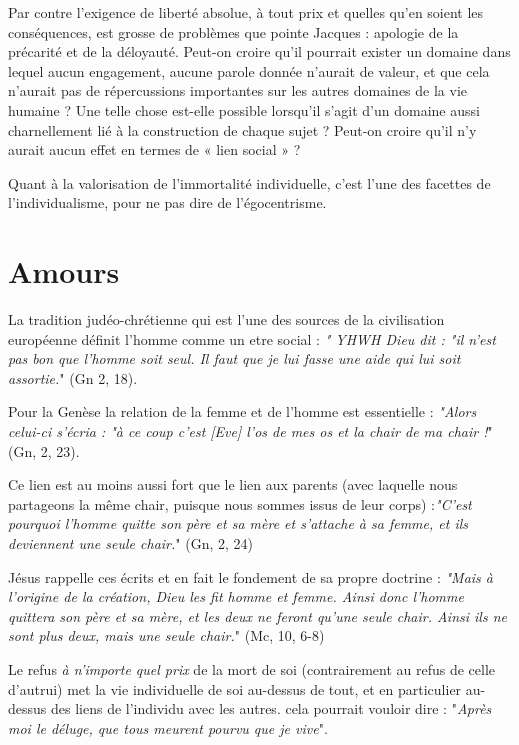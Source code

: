  Par contre l'exigence de liberté absolue, à tout prix et quelles qu'en soient les conséquences, est grosse de problèmes que pointe Jacques  : apologie de la précarité et de la déloyauté. Peut-on croire qu'il pourrait exister un domaine  dans lequel aucun engagement, aucune parole donnée n'aurait de valeur, et que cela n'aurait pas de répercussions importantes sur les autres domaines de la vie humaine ? Une telle chose est-elle possible lorsqu'il s'agit d'un domaine aussi charnellement lié à la construction de chaque sujet ? Peut-on croire qu'il n'y aurait aucun effet en termes de « lien social » ?
 
 Quant à la valorisation de l'immortalité individuelle, c'est l'une des facettes de l'individualisme, pour ne pas dire de l'égocentrisme. 
 


 \chapter{Amours}
 
  
 
 La tradition judéo-chrétienne qui est l'une des sources de la civilisation européenne définit l'homme comme un etre social : \emph{" YHWH Dieu dit : "il n'est pas bon que l'homme soit seul. Il faut que je lui fasse une aide qui lui soit assortie.}" (Gn 2, 18). 
 
 Pour la Genèse la relation de la femme et de l'homme est essentielle : \emph{"Alors celui-ci s'écria : "à ce coup c'est [Eve] l'os de mes os et la chair de ma chair !}" (Gn, 2, 23). 
 
 Ce lien est au moins aussi fort que le lien aux parents (avec laquelle nous partageons la même chair, puisque nous sommes issus de leur corps) :\emph{"C'est pourquoi l'homme quitte son père et sa mère et s'attache à sa femme, et ils deviennent une seule chair.}" (Gn, 2, 24)
 
Jésus rappelle ces écrits et en fait le fondement de sa propre doctrine :
\emph{"Mais à l'origine de la création, Dieu les fit homme et femme. Ainsi donc l'homme quittera son père et sa mère, et les deux ne feront qu'une seule chair. Ainsi ils ne sont plus deux, mais une seule chair.}" (Mc, 10, 6-8)

Le refus \emph{à n'importe quel prix} de la mort de soi (contrairement au refus de celle d'autrui) met la vie individuelle de soi au-dessus de tout, et en particulier au-dessus des liens de l'individu avec les autres.  cela pourrait vouloir dire : "\emph{Après moi le déluge, que tous meurent pourvu que je vive}". 

